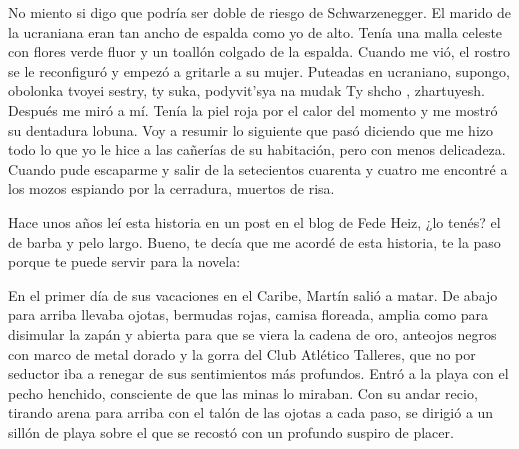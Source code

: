 \documentclass[11pt,twoside,openright,a6paper]{book}
\begin{document}
No miento si digo que podría ser doble de riesgo de Schwarzenegger. El
marido de la ucraniana eran tan ancho de espalda como yo de alto. Tenía
una malla celeste con flores verde fluor y un toallón colgado de la
espalda. Cuando me vió, el rostro se le reconfiguró y empezó a gritarle a
su mujer. Puteadas en ucraniano, supongo, obolonka tvoyei sestry, ty suka,
podyvit'sya na mudak Ty shcho , zhartuyesh. Después me miró a mí. Tenía
la piel roja por el calor del momento y me mostró su dentadura lobuna. Voy
a resumir lo siguiente que pasó diciendo que me hizo todo lo que yo le
hice a las cañerías de su habitación, pero con menos delicadeza. Cuando
pude escaparme y salir de la setecientos cuarenta y cuatro me encontré a
los mozos espiando por la cerradura, muertos de risa.


\vspace{0.5cm}
\hrulefill\hspace{0.2cm} \decofourleft\decofourright \hspace{0.2cm} \hrulefill
\vspace{0.5cm}

Hace unos años leí esta historia en un post en el blog de Fede Heiz,
¿lo tenés? el de barba y pelo largo. Bueno, te decía que me acordé de
esta historia, te la paso porque te puede servir para la novela:

En el primer día de sus vacaciones en el Caribe, Martín salió a matar. De
abajo para arriba llevaba ojotas, bermudas rojas, camisa floreada, amplia
como para disimular la zapán y abierta para que se viera la cadena de oro,
anteojos negros con marco de metal dorado y la gorra del Club Atlético
Talleres, que no por seductor iba a renegar de sus sentimientos más
profundos. Entró a la playa con el pecho henchido, consciente de que las
minas lo miraban. Con su andar recio, tirando arena para arriba con el
talón de las ojotas a cada paso, se dirigió a un sillón de playa sobre
el que se recostó con un profundo suspiro de placer.
\end{document}
